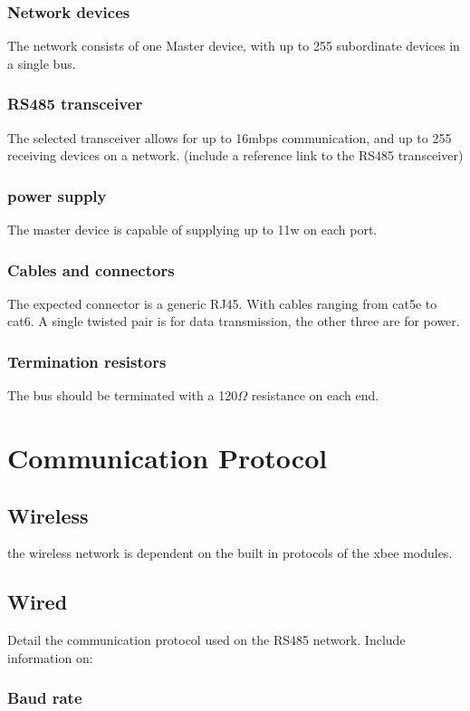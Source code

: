 \documentclass[a4paper,12pt]{article}
\begin{document}
	\subsubsection{Network devices}
	The network consists of one Master device, with up to 255 subordinate devices in a single bus.
	\subsubsection{RS485 transceiver}
	The selected transceiver allows for up to 16mbps communication, and up to 255 receiving devices on a network.
	(include a reference link to the RS485 transceiver)
	\subsubsection{power supply}
	The master device is capable of supplying up to 11w on each port.
	
	\subsubsection{Cables and connectors}
	The expected connector is a generic RJ45.
	With cables ranging from cat5e to cat6.
	A single twisted pair is for data transmission, the other three are for power.
	
	\subsubsection{Termination resistors}
	The bus should be terminated with a 120$\Omega$ resistance on each end.
	
	\section{Communication Protocol}
	
	\subsection{Wireless}
	the wireless network is dependent on the built in protocols of the xbee modules.
	
	\subsection{Wired}
	Detail the communication protocol used on the RS485 network. Include information on:
	
	\subsubsection{Baud rate}
	
\end{document}
